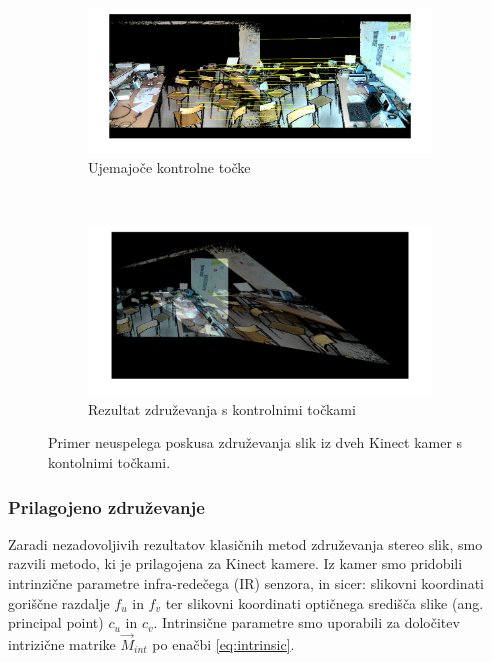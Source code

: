 \begin{figure}[htb]
\centering
\begin{subfigure}[t]{0.45\columnwidth}
\includegraphics[width=\columnwidth]{./Slike/matched-points.png}
\caption{Ujemajoče kontrolne točke}
\label{fig:zdruzevanje-ujemajoce-cp}
\end{subfigure}
~
\begin{subfigure}[t]{0.45\columnwidth}
\includegraphics[width=\columnwidth]{./Slike/points-calibration-result.png}
\caption{Rezultat združevanja s kontrolnimi točkami}
\label{fig:zdruzevanje-result-cp}
\end{subfigure}
\caption{Primer neuspelega poskusa združevanja slik iz dveh Kinect kamer s kontolnimi točkami.}
\label{fig:zdruzevanje-cp}
\end{figure}


\subsubsection{Prilagojeno združevanje}
Zaradi nezadovoljivih rezultatov klasičnih metod združevanja stereo slik, smo razvili metodo, ki je prilagojena za Kinect kamere. Iz kamer smo pridobili intrinzične parametre infra-redečega (IR) senzora, in sicer: slikovni koordinati goriščne razdalje $f_u$ in $f_v$ ter slikovni koordinati optičnega središča slike (ang. principal point) $c_u$ in $c_v$. Intrinsične parametre smo uporabili za določitev intrizične matrike $\vec{M}_{int}$ po enačbi \eqref{eq:intrinsic}.



